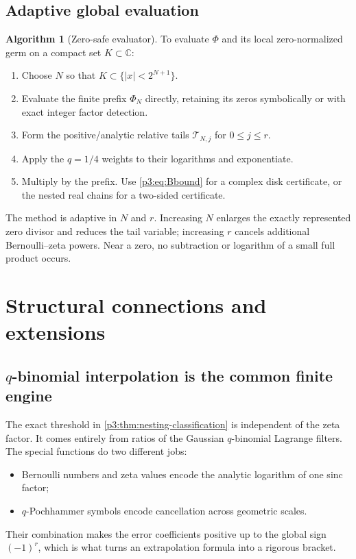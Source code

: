 \documentclass[11pt]{article}
\numberwithin{equation}{section}
\theoremstyle{definition}
\newtheorem{algorithm}[theorem]{Algorithm}
\theoremstyle{remark}
\newcommand{\C}{\mathbb C}
\begin{document}
\subsection{Adaptive global evaluation}

\begin{algorithm}[Zero-safe evaluator]\label{p3:alg:evaluator}
To evaluate $\Phi$ and its local zero-normalized germ on a compact set $K\subset\C$:
\begin{enumerate}
\item Choose $N$ so that $K\subset\{|x|<2^{N+1}\}$.
\item Evaluate the finite prefix $\Phi_N$ directly, retaining its zeros symbolically or with
      exact integer factor detection.
\item Form the positive/analytic relative tails $\mathcal T_{N,j}$ for $0\le j\le r$.
\item Apply the $q=1/4$ weights to their logarithms and exponentiate.
\item Multiply by the prefix.  Use \eqref{p3:eq:Bbound} for a complex disk certificate, or the
      nested real chains for a two-sided certificate.
\end{enumerate}
\end{algorithm}

The method is adaptive in $N$ and $r$.  Increasing $N$ enlarges the exactly represented zero
divisor and reduces the tail variable; increasing $r$ cancels additional Bernoulli--zeta
powers.  Near a zero, no subtraction or logarithm of a small full product occurs.

\section{Structural connections and extensions}\label{p3:sec:connections}

\subsection{\texorpdfstring{$q$}{q}-binomial interpolation is the common finite engine}

The exact threshold in \cref{p3:thm:nesting-classification} is independent of the zeta factor.
It comes entirely from ratios of the Gaussian $q$-binomial Lagrange filters.  The special
functions do two different jobs:
\begin{itemize}
\item Bernoulli numbers and zeta values encode the analytic logarithm of one sinc factor;
\item $q$-Pochhammer symbols encode cancellation across geometric scales.
\end{itemize}
Their combination makes the error coefficients positive up to the global sign $(-1)^r$,
which is what turns an extrapolation formula into a rigorous bracket.
\end{document}
